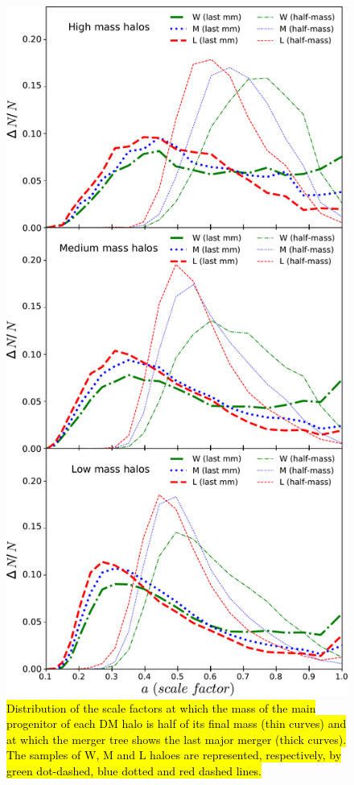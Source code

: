 \documentclass[fleqn,usenatbib]{mnras}
\newcommand{\Wh}{\mathrm{W}}
\newcommand{\Lh}{\mathrm{L}}
\newcommand{\Mh}{\mathrm{M}}
\begin{document}
\begin{figure}
	\includegraphics[width=\columnwidth]{400Mpc_figs/acrecion_M123.pdf}
    \caption{\hl{Distribution of the scale factors at which the mass of the main progenitor of each DM halo is half of its final mass (thin curves) and at which the merger tree shows the last major merger (thick curves). The samples of $\Wh$, $\Mh$ and $\Lh$ haloes are represented, respectively, by green dot-dashed, blue dotted and red dashed lines.}}
    \label{fig:acrecion_M123}
\end{figure}
\end{document}
